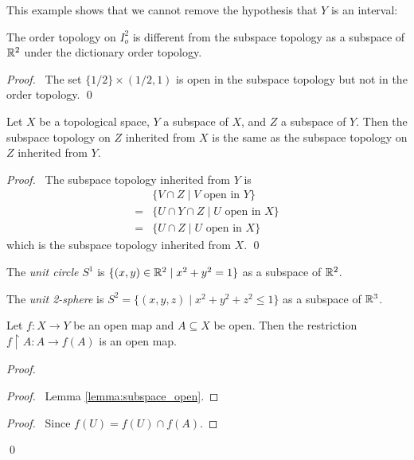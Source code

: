 This example shows that we cannot remove the hypothesis that $Y$ is an interval:

\begin{example}
    The order topology on $I_o^2$ is different from the subspace topology as a subspace of $\mathbb{R}^2$ under
    the dictionary order topology.
\end{example}

\begin{proof}
    \pf\ The set $\{ 1/2 \} \times (1/2, 1)$ is open in the subspace topology but not in the order topology.
    \qed
\end{proof}

\begin{proposition}
    \label{proposition:subspace_transitive}
    Let $X$ be a topological space, $Y$ a subspace of $X$, and $Z$ a subspace of $Y$. Then the subspace
    topology on $Z$ inherited from $X$ is the same as the subspace topology on $Z$ inherited from $Y$.
\end{proposition}

\begin{proof}
    \pf\ The subspace topology inherited from $Y$ is
    \begin{align*}
        & \{ V \cap Z \mid V \text{ open in } Y \} \\
        = & \{ U \cap Y \cap Z \mid U \text{ open in } X \} \\
        = & \{ U \cap Z \mid U \text{ open in } X \}
    \end{align*}
    which is the subspace topology inherited from $X$. \qed
\end{proof}

\begin{definition}
    The \emph{unit circle} $S^1$ is $\{ (x,y) \in \mathbb{R}^2 \mid x^2 + y^2 = 1 \}$ as a subspace of $\mathbb{R}^2$.
\end{definition}

\begin{definition}
    The \emph{unit 2-sphere} is $S^2 = \{ (x,y,z) \mid x^2 + y^2 + z^2 \leq 1 \}$ as a subspace of $\mathbb{R}^3$.
\end{definition}

\begin{proposition}
    Let $f : X \rightarrow Y$ be an open map and $A \subseteq X$ be open. Then the restriction $f \restriction A : A \rightarrow f(A)$ is an open map.
\end{proposition}

\begin{proof}
    \pf
    \begin{proof}
        \pf\ Lemma \ref{lemma:subspace_open}.
    \end{proof}
    \begin{proof}
        \pf\ Since $f(U) = f(U) \cap f(A)$.
    \end{proof}
    \qed
\end{proof}

